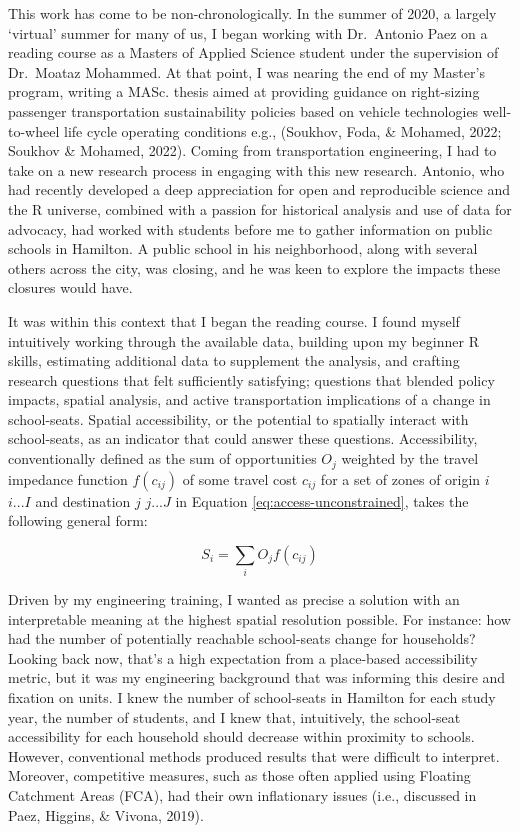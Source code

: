 \documentclass[
11pt, %
oneside, %
english, %
singlespacing, %
]{macthesis} %
\begin{document}
This work has come to be non-chronologically. In the summer of 2020, a largely `virtual' summer for many of us, I began working with Dr.~Antonio Paez on a reading course as a Masters of Applied Science student under the supervision of Dr.~Moataz Mohammed. At that point, I was nearing the end of my Master's program, writing a MASc. thesis aimed at providing guidance on right-sizing passenger transportation sustainability policies based on vehicle technologies well-to-wheel life cycle operating conditions e.g., (Soukhov, Foda, \& Mohamed, 2022; Soukhov \& Mohamed, 2022). Coming from transportation engineering, I had to take on a new research process in engaging with this new research. Antonio, who had recently developed a deep appreciation for open and reproducible science and the R universe, combined with a passion for historical analysis and use of data for advocacy, had worked with students before me to gather information on public schools in Hamilton. A public school in his neighborhood, along with several others across the city, was closing, and he was keen to explore the impacts these closures would have.

It was within this context that I began the reading course. I found myself intuitively working through the available data, building upon my beginner R skills, estimating additional data to supplement the analysis, and crafting research questions that felt sufficiently satisfying; questions that blended policy impacts, spatial analysis, and active transportation implications of a change in school-seats. Spatial accessibility, or the potential to spatially interact with school-seats, as an indicator that could answer these questions. Accessibility, conventionally defined as the sum of opportunities \(O_j\) weighted by the travel impedance function \(f(c_{ij})\) of some travel cost \(c_{ij}\) for a set of zones of origin \(i\) \(i...I\) and destination \(j\) \(j...J\) in Equation \ref{eq:access-unconstrained}, takes the following general form:

\begin{equation} 
\label{eq:access-unconstrained}
S_i = \sum_i O_j f(c_{ij}) 
\end{equation} 

Driven by my engineering training, I wanted as precise a solution with an interpretable meaning at the highest spatial resolution possible. For instance: how had the number of potentially reachable school-seats change for households? Looking back now, that's a high expectation from a place-based accessibility metric, but it was my engineering background that was informing this desire and fixation on units. I knew the number of school-seats in Hamilton for each study year, the number of students, and I knew that, intuitively, the school-seat accessibility for each household should decrease within proximity to schools. However, conventional methods produced results that were difficult to interpret. Moreover, competitive measures, such as those often applied using Floating Catchment Areas (FCA), had their own inflationary issues (i.e., discussed in Paez, Higgins, \& Vivona, 2019).
\end{document}
